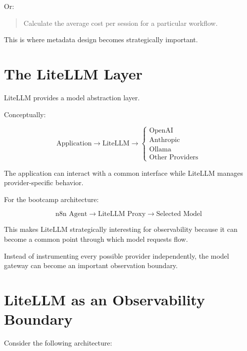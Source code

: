 \documentclass[11pt,a4paper]{article}
\begin{document}
Or:

\begin{quote}
Calculate the average cost per session for a particular workflow.
\end{quote}

This is where metadata design becomes strategically important.

\section{The LiteLLM Layer}

LiteLLM provides a model abstraction layer.

Conceptually:

\[
\text{Application}
\rightarrow
\text{LiteLLM}
\rightarrow
\begin{cases}
\text{OpenAI}\\
\text{Anthropic}\\
\text{Ollama}\\
\text{Other Providers}
\end{cases}
\]

The application can interact with a common interface while LiteLLM manages provider-specific behavior.

For the bootcamp architecture:

\[
\text{n8n Agent}
\rightarrow
\text{LiteLLM Proxy}
\rightarrow
\text{Selected Model}
\]

This makes LiteLLM strategically interesting for observability because it can become a common point through which model requests flow.

Instead of instrumenting every possible provider independently, the model gateway can become an important observation boundary.

\section{LiteLLM as an Observability Boundary}

Consider the following architecture:
\end{document}
